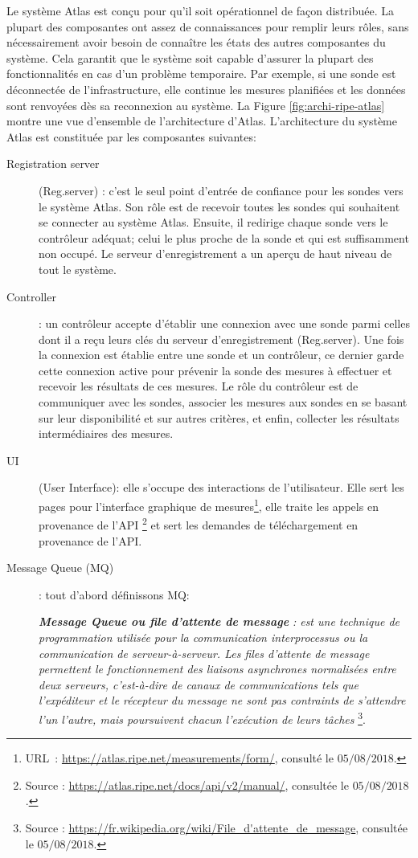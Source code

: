 Le système Atlas est conçu pour qu'il soit opérationnel de façon distribuée. La plupart des composantes ont assez de connaissances pour remplir leurs rôles, sans nécessairement avoir besoin de connaître les états des autres composantes du système. Cela garantit que le système soit capable d'assurer la plupart des fonctionnalités en cas  d'un problème temporaire. Par exemple, si une sonde est déconnectée de l'infrastructure, elle continue les mesures planifiées et les données sont renvoyées dès sa reconnexion au système.
La Figure  \ref{fig:archi-ripe-atlas} montre une vue d'ensemble de l'architecture d'Atlas.
L'architecture du système Atlas est constituée par  les composantes suivantes:
\begin{description}
	\item [Registration server] (Reg.server) : c'est le seul point d'entrée   de confiance pour les sondes vers le système Atlas. Son rôle est de recevoir toutes les sondes qui souhaitent se connecter au système  Atlas. Ensuite, il redirige chaque sonde vers le contrôleur adéquat; celui  le plus proche de la sonde et qui est  suffisamment non occupé.  Le serveur d'enregistrement  a un aperçu de haut niveau de tout le système.
	
	\item [Controller]: un contrôleur accepte d'établir une connexion avec une sonde parmi celles dont il a reçu leurs clés du serveur d'enregistrement (Reg.server). Une fois la connexion est établie entre une sonde et un contrôleur, ce dernier garde cette connexion active pour  prévenir la sonde des mesures à effectuer et recevoir les résultats de ces mesures.  Le rôle du contrôleur est de communiquer avec les sondes,  associer les mesures aux sondes en se basant sur leur disponibilité  et sur autres critères, et enfin, collecter les résultats intermédiaires des mesures.
	
	\item [UI] (User Interface): elle s'occupe des interactions de l'utilisateur. Elle sert les pages pour l'interface graphique de mesures\footnote{URL~: \url{https://atlas.ripe.net/measurements/form/}, consulté le $05/08/2018$.}, elle traite les appels en provenance de l'API \footnote{Source : \url{https://atlas.ripe.net/docs/api/v2/manual/}, consultée le $05/08/2018$.} et sert les demandes de téléchargement en provenance de l'API.
	
	\item [Message Queue (MQ)] : tout d'abord définissons MQ:
	\begin{tcolorbox}[title=Message Queue]
		\og    \textbf{\textit{Message Queue ou file d'attente de message}} \textit{:  est une technique de programmation utilisée pour la communication interprocessus ou la communication de serveur-à-serveur. Les files d'attente de message permettent le fonctionnement des liaisons asynchrones normalisées entre deux serveurs, c'est-à-dire de canaux de communications tels que l'expéditeur et le récepteur du message ne sont pas contraints de s'attendre l'un l'autre, mais poursuivent chacun l'exécution de leurs tâches} \footnote{Source : \url{https://fr.wikipedia.org/wiki/File\_d'attente\_de\_message}, consultée le $05/08/2018$.}. \fg{}
	\end{tcolorbox} 
	

\end{description}
